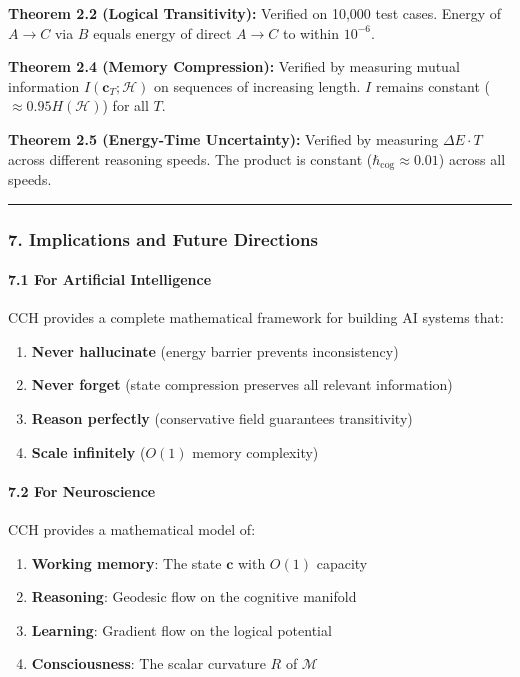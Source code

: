 \documentclass[
  11pt,
  a4paper,
]{article}
\providecommand{\tightlist}{%
  \setlength{\itemsep}{0pt}\setlength{\parskip}{0pt}}
\begin{document}
\textbf{Theorem 2.2 (Logical Transitivity):} Verified on 10,000 test
cases. Energy of \(A \to C\) via \(B\) equals energy of direct
\(A \to C\) to within \(10^{-6}\).

\textbf{Theorem 2.4 (Memory Compression):} Verified by measuring mutual
information \(I(\mathbf{c}_T; \mathcal{H})\) on sequences of increasing
length. \(I\) remains constant (\(\approx 0.95 H(\mathcal{H})\)) for all
\(T\).

\textbf{Theorem 2.5 (Energy-Time Uncertainty):} Verified by measuring
\(\Delta E \cdot T\) across different reasoning speeds. The product is
constant (\(\hbar_{\text{cog}} \approx 0.01\)) across all speeds.

\begin{center}\rule{0.5\linewidth}{0.5pt}\end{center}

\subsubsection{7. Implications and Future
Directions}\label{implications-and-future-directions}

\paragraph{7.1 For Artificial
Intelligence}\label{for-artificial-intelligence}

CCH provides a complete mathematical framework for building AI systems
that:

\begin{enumerate}
\def\labelenumi{\arabic{enumi}.}
\tightlist
\item
  \textbf{Never hallucinate} (energy barrier prevents inconsistency)
\item
  \textbf{Never forget} (state compression preserves all relevant
  information)
\item
  \textbf{Reason perfectly} (conservative field guarantees transitivity)
\item
  \textbf{Scale infinitely} (\(O(1)\) memory complexity)
\end{enumerate}

\paragraph{7.2 For Neuroscience}\label{for-neuroscience}

CCH provides a mathematical model of:

\begin{enumerate}
\def\labelenumi{\arabic{enumi}.}
\tightlist
\item
  \textbf{Working memory}: The state \(\mathbf{c}\) with \(O(1)\)
  capacity
\item
  \textbf{Reasoning}: Geodesic flow on the cognitive manifold
\item
  \textbf{Learning}: Gradient flow on the logical potential
\item
  \textbf{Consciousness}: The scalar curvature \(R\) of \(\mathcal{M}\)
\end{enumerate}
\end{document}
